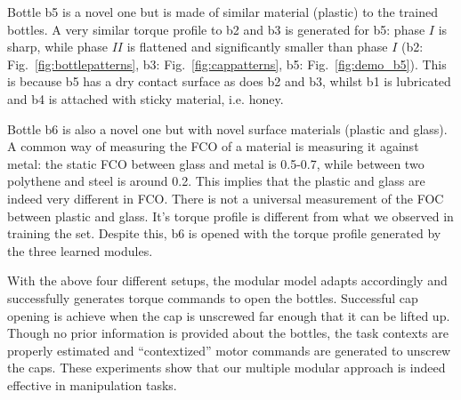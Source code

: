 Bottle b5 is a novel one but is made of similar material (plastic) to the trained bottles. A very similar torque profile to b2 and b3 is generated for b5: phase $I$ is sharp, while phase $II$ is flattened and significantly smaller than phase $I$ (b2: Fig.~\ref{fig:bottlepatterns}, b3: Fig.~\ref{fig:cappatterns}, b5: Fig.~\ref{fig:demo_b5}). This is because b5 has a dry contact surface as does b2 and b3, whilst b1 is lubricated and b4 is attached with sticky material, i.e. honey.

Bottle b6 is also a novel one but with novel surface materials (plastic and glass). A common way of measuring the FCO of a material is measuring it against metal: the static FCO between glass and metal is 0.5-0.7, while between two polythene and steel is around 0.2. This implies that the plastic and glass are indeed very different in FCO. There is not a universal measurement of the FOC between plastic and glass. It's torque profile is different from what we observed in training the set. Despite this, b6 is opened with the torque profile generated by the three learned modules.

With the above four different setups, the modular model adapts accordingly and successfully generates torque commands to open the bottles. Successful cap opening is achieve when the cap is unscrewed far enough that it can be lifted up. Though no prior information is provided about the bottles, the task contexts are properly estimated and ``contextized'' motor commands are generated to unscrew the caps. These experiments show that our multiple modular approach is indeed effective in manipulation tasks.



